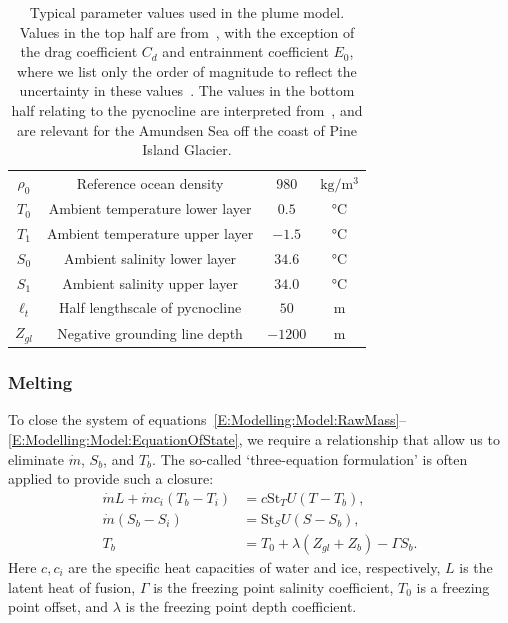 \documentclass{jfm}
\begin{document}
\begin{table}
\begin{center}
\begin{tabular}{cccc}
$\rho_0$ &  Reference ocean density & $980$ & $\si{\kilogram / \meter^{3}}$\\
$T_{0}$ & Ambient temperature lower layer &$0.5$        &  $\si{ \celsius}$   \\
$T_{1}$ & Ambient temperature upper layer &$-1.5$        &  $\si{ \celsius}$  \\
$S_{0}$ & Ambient salinity lower layer &$34.6$        &  $\si{ \celsius}$   \\
$S_{1}$ & Ambient salinity upper layer &$34.0$        &  $\si{ \celsius}$  \\
$\ell_t$ & Half lengthscale of pycnocline & $50$ & $\si{\meter}$\\
$Z_{gl}$ & Negative grounding line depth & $-1200$ & $\si{\meter}$\\
\hline
\end{tabular}
\end{center}
\caption{Typical parameter values used in the plume model. Values in the top half are from~\citet{Jenkins1991JGeophysResOceans}, with the exception of the drag coefficient $C_d$ and entrainment coefficient $E_0$, where we list only the order of magnitude to reflect the uncertainty in these values~\citep{Hewitt2020AnnRevFlu}. The values in the bottom half relating to the pycnocline are interpreted from~\citet{Jenkins2018NatureGeo}, and are relevant for the Amundsen Sea off the coast of Pine Island Glacier.}\label{T:Constants}
\end{table}

\subsubsection{Melting}
To close the system of equations~\eqref{E:Modelling:Model:RawMass}--\eqref{E:Modelling:Model:EquationOfState}, we require a relationship that allow us to eliminate $\dot{m}$, $S_b$, and $T_b$.  The so-called `three-equation formulation' is often applied to provide such a closure:
\begin{align}
\dot{m}L + \dot{m}c_i (T_b - T_i) &= c \mathrm{St}_T U(T - T_b),\label{E:Modelling:Model:Closure:3eqn1}\\
\dot{m}(S_b - S_i) &= \mathrm{St}_S U(S - S_b),\label{E:Modelling:Model:Closure:3eqn2}\\
T_b &= T_0 + \lambda (Z_{gl} + Z_b) - \Gamma S_b.\label{E:Modelling:Model:Closure:3eqn3}
\end{align}  
Here $c, c_i$ are the specific heat capacities of water and ice, respectively, $L$ is the latent heat of fusion, $\Gamma$ is the freezing point salinity coefficient,  $T_0$ is a freezing point offset, and $\lambda$ is the freezing point depth coefficient.
\end{document}
